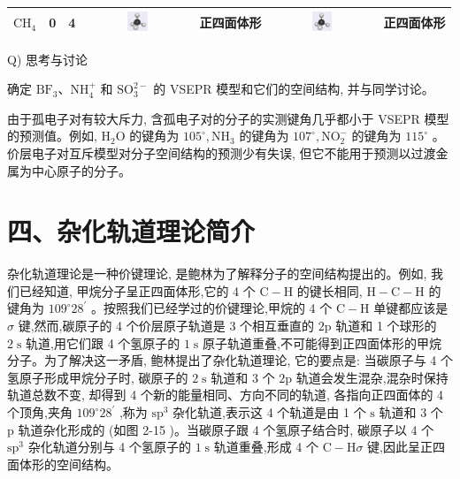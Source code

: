 \documentclass[10pt]{article}
\begin{document}
\begin{center}
{\begin{tabular}{|c|c|c|c|c|c|c|}
\hline
\({\mathrm{{CH}}}_{4}\) & 0 & 4 & \includegraphics[max width=0.2\textwidth]{images/0190e026-5a11-7df7-bd27-54d09026ba7a_49_176888.jpg} & 正四面体形 & \includegraphics[max width=0.2\textwidth]{images/0190e026-5a11-7df7-bd27-54d09026ba7a_49_176889.jpg} & 正四面体形 \\
\hline
\end{tabular}
}
\end{center}

\begin{mdframed}

Q) 思考与讨论

确定 \({\mathrm{{BF}}}_{3}\text{、}{\mathrm{{NH}}}_{4}^{ + }\) 和 \({\mathrm{{SO}}}_{3}^{2 - }\) 的 VSEPR 模型和它们的空间结构, 并与同学讨论。

\end{mdframed}

由于孤电子对有较大斥力, 含孤电子对的分子的实测键角几乎都小于 VSEPR 模型的预测值。例如, \({\mathrm{H}}_{2}\mathrm{O}\) 的键角为 \({105}^{ \circ },{\mathrm{{NH}}}_{3}\) 的键角为 \({107}^{ \circ },{\mathrm{{NO}}}_{2}^{ - }\) 的键角为 \({115}^{ \circ }\) 。价层电子对互斥模型对分子空间结构的预测少有失误, 但它不能用于预测以过渡金属为中心原子的分子。

\section*{四、杂化轨道理论简介}

杂化轨道理论是一种价键理论, 是鲍林为了解释分子的空间结构提出的。例如, 我们已经知道, 甲烷分子呈正四面体形,它的 4 个 \(\mathrm{C} - \mathrm{H}\) 的键长相同, \(\mathrm{H} - \mathrm{C} - \mathrm{H}\) 的键角为 \({109}^{ \circ }{28}^{\prime }\) 。按照我们已经学过的价键理论,甲烷的 4 个 \(\mathrm{C} - \mathrm{H}\) 单键都应该是 \(\sigma\) 键,然而,碳原子的 4 个价层原子轨道是 3 个相互垂直的 \(2\mathrm{p}\) 轨道和 1 个球形的 \(2\mathrm{\;s}\) 轨道,用它们跟 4 个氢原子的 \(1\mathrm{\;s}\) 原子轨道重叠,不可能得到正四面体形的甲烷分子。为了解决这一矛盾, 鲍林提出了杂化轨道理论, 它的要点是: 当碳原子与 4 个氢原子形成甲烷分子时, 碳原子的 \(2\mathrm{\;s}\) 轨道和 3 个 \(2\mathrm{p}\) 轨道会发生混杂,混杂时保持轨道总数不变, 却得到 4 个新的能量相同、方向不同的轨道, 各指向正四面体的 4 个顶角,夹角 \({109}^{ \circ }{28}^{\prime }\) ,称为 \({\mathrm{{sp}}}^{3}\) 杂化轨道,表示这 4 个轨道是由 1 个 \(\mathrm{s}\) 轨道和 3 个 \(\mathrm{p}\) 轨道杂化形成的 (如图 2-15 )。当碳原子跟 4 个氢原子结合时, 碳原子以 4 个 \({\mathrm{{sp}}}^{3}\) 杂化轨道分别与 4 个氢原子的 \(1\mathrm{\;s}\) 轨道重叠,形成 4 个 \(\mathrm{C} - \mathrm{H}\sigma\) 键,因此呈正四面体形的空间结构。
\end{document}
